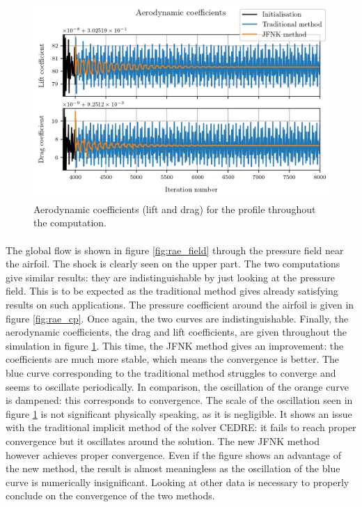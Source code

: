         \begin{figure}
          \centering
          \includegraphics{figures/rae_coefficients.png}
          \caption{Aerodynamic coefficients (lift and drag) for the profile throughout the computation.}
          \label{fig:rae_coefficients}
        \end{figure}

        \paragraph{}
        The global flow is shown in figure \ref{fig:rae_field} through the pressure field near the airfoil.
        The shock is clearly seen on the upper part.
        The two computations give similar results: they are indistinguishable by just looking at the pressure field.
        This is to be expected as the traditional method gives already satisfying results on such applications.
        The pressure coefficient around the airfoil is given in figure \ref{fig:rae_cp}.
        Once again, the two curves are indistinguishable.
        Finally, the aerodynamic coefficients, the drag and lift coefficients, are given throughout the simulation in figure \ref{fig:rae_coefficients}.
        This time, the JFNK method gives an improvement: the coefficients are much more stable, which means the convergence is better.
        The blue curve corresponding to the traditional method struggles to converge and seems to oscillate periodically.
        In comparison, the oscillation of the orange curve is dampened: this corresponds to convergence.
        The scale of the oscillation seen in figure \ref{fig:rae_coefficients} is not significant physically speaking, as it is negligible.
        It shows an issue with the traditional implicit method of the solver CEDRE: it fails to reach proper convergence but it oscillates around the solution.
        The new JFNK method however achieves proper convergence.
        Even if the figure shows an advantage of the new method, the result is almost meaningless as the oscillation of the blue curve is numerically insignificant.
        Looking at other data is necessary to properly conclude on the convergence of the two methods.


